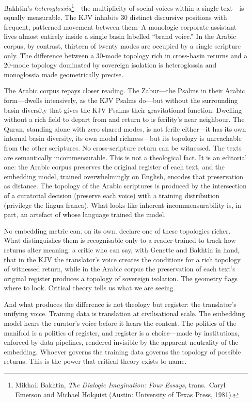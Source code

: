 Bakhtin's \emph{heteroglossia}\footnote{Mikhail Bakhtin, \emph{The Dialogic Imagination: Four Essays}, trans.\ Caryl Emerson and Michael Holquist (Austin: University of Texas Press, 1981).}---the multiplicity of social voices within a single text---is equally measurable. The KJV inhabits 30 distinct discursive positions with frequent, patterned movement between them. A monologic corporate assistant lives almost entirely inside a single basin labelled ``brand voice.'' In the Arabic corpus, by contrast, thirteen of twenty modes are occupied by a single scripture only. The difference between a 30-mode topology rich in cross-basin returns and a 20-mode topology dominated by sovereign isolation is heteroglossia and monoglossia made geometrically precise.

The Arabic corpus repays closer reading. The Zabur---the Psalms in their Arabic form---dwells intensively, as the KJV Psalms do---but without the surrounding basin diversity that gives the KJV Psalms their gravitational function. Dwelling without a rich field to depart from and return to is ferility's near neighbour. The Quran, standing alone with zero shared modes, is not ferile either---it has its own internal basin diversity, its own modal richness---but its topology is unreachable from the other scriptures. No cross-scripture return can be witnessed. The texts are semantically incommensurable. This is not a theological fact. It is an editorial one: the Arabic corpus preserves the original register of each text, and the embedding model, trained overwhelmingly on English, encodes that preservation as distance. The topology of the Arabic scriptures is produced by the intersection of a curatorial decision (preserve each voice) with a training distribution (privilege the lingua franca). What looks like inherent incommensurability is, in part, an artefact of whose language trained the model.

No embedding metric can, on its own, declare one of these topologies richer. What distinguishes them is recognisable only to a reader trained to track how returns alter meaning: a critic who can say, with Genette and Bakhtin in hand, that in the KJV the translator's voice creates the conditions for a rich topology of witnessed return, while in the Arabic corpus the preservation of each text's original register produces a topology of sovereign isolation. The geometry flags where to look. Critical theory tells us what we are seeing.

And what produces the difference is not theology but register: the translator's unifying voice. Training data is translation at civilisational scale. The embedding model hears the curator's voice before it hears the content. The politics of the manifold is a politics of register, and register is a choice---made by institutions, enforced by data pipelines, rendered invisible by the apparent neutrality of the embedding. Whoever governs the training data governs the topology of possible returns. This is the power that critical theory exists to name.

